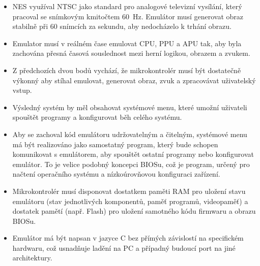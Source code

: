 \begin{itemize}
    \item NES využíval NTSC jako standard pro analogové televizní vysílání, který pracoval se
        snímkovým kmitočtem 60~Hz. Emulátor musí generovat obraz stabilně při 60 snímcích za
        sekundu, aby nedocházelo k trhání obrazu.
    \item Emulator musí v reálném čase emulovat CPU, PPU a APU tak, aby byla zachována přesná časová
        souslednost mezi herní logikou, obrazem a zvukem.
    \item Z předchozích dvou bodů vychází, že mikrokontrolér musí být dostatečně výkonný aby stíhal
        emulovat, generovat obraz, zvuk a zpracovávat uživatelský vstup.
    \item Výsledný systém by měl obsahovat systémové menu, které umožní uživateli spouštět programy
        a konfigurovat běh celého systému.
    \item Aby se zachoval kód emulátoru udržovatelným a čitelným, systémové menu má být realizováno
        jako samostatný program, který bude schopen komunikovat s emulátorem, aby spouštět ostatní
        programy nebo konfigurovat emulátor. To je velice podobný koncepci BIOSu, což je program,
        určený pro načtení operačního systému a nízkoúrovňovou konfiguraci zařízení.
    \item Mikrokontrolér musí disponovat dostatkem paměti RAM pro uložení stavu emulátoru
        (stav jednotlivých komponentů, paměť programů, videopaměť) a dostatek pamětí (např. Flash)
        pro uložení samotného kódu firmwaru a obrazu BIOSu.
    \item Emulátor má být napsan v jazyce C bez přímých závislostí na specifickém hardwaru, což
        usnadňuje ladění na PC a případný budoucí port na jiné architektury.

\end{itemize}
